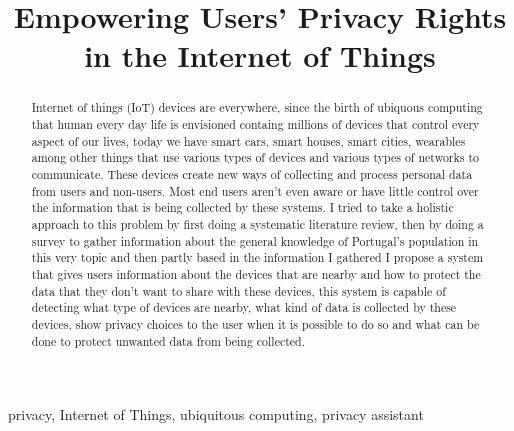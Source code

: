 \documentclass[conference]{IEEEtran}
\begin{document}
\title{Empowering Users' Privacy Rights in the Internet of Things\\
}

\author{
}

\maketitle

\begin{abstract}
Internet of things (IoT) devices are everywhere, since the birth of ubiquous
computing that human every day life is envisioned containg millions of devices
that control every aspect of our lives, today we have smart cars, smart houses,
smart cities, wearables among other things that use various types of devices
and various types of networks to communicate. These devices create new ways 
of collecting and process personal data from users and non-users.
Most end users aren't even aware or have little control over the information that
is being collected by these systems. I tried to take a holistic approach to this
problem by first doing a systematic literature review, then by doing a survey to gather
information about the general knowledge of Portugal's population in this
very topic and then partly based in the information I gathered I propose
a system that gives users information about the devices that are nearby
and how to protect the data that they don't want to share with these devices,
this system is capable of detecting what type of devices are nearby,
what kind of data is collected by these devices, show privacy choices
to the user when it is possible to do so and what can be done to protect
unwanted data from being collected.
\end{abstract}

\begin{IEEEkeywords}
privacy, Internet of Things, ubiquitous computing, privacy assistant
\end{IEEEkeywords}
\end{document}
